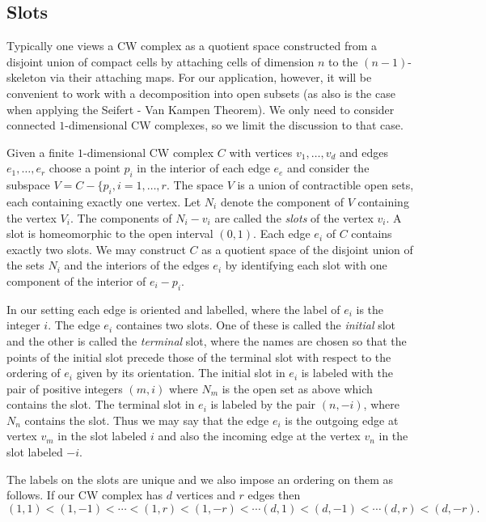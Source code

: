 \documentclass[12pt]{article}
\theoremstyle{definition}
\begin{document}
   \subsection{Slots}

   Typically one views a CW complex as a quotient space constructed from a
   disjoint union of compact cells by attaching cells of dimension $n$ to the
   $(n-1)$-skeleton via their attaching maps.  For our application, however, it
   will be convenient to work with a decomposition into open subsets (as also is
   the case when applying the Seifert - Van Kampen Theorem).  We only need to
   consider connected $1$-dimensional CW complexes, so we limit the discussion
   to that case.

   Given a finite $1$-dimensional CW complex $C$ with vertices $v_1, \ldots,
   v_d$ and edges $e_1, \ldots, e_r$ choose a point $p_i$ in the interior of
   each edge $e_e$ and consider the subspace $V = C - \{p_i, i=1, \ldots, r$.
   The space $V$ is a union of contractible open sets, each containing exactly
   one vertex.  Let $N_i$ denote the component of $V$ containing the vertex
   $V_i$.  The components of $N_i - v_i$ are called the {\it slots} of the
   vertex $v_i$.  A slot is homeomorphic to the open interval $(0, 1)$.
   Each edge $e_i$ of $C$ contains exactly two slots.  We may construct $C$
   as a quotient space of the disjoint union of the sets $N_i$ and the interiors
   of the edges $e_i$ by identifying each slot with one component of the
   interior of $e_i - p_i$.

   In our setting each edge is oriented and labelled, where the label of
   $e_i$ is the integer $i$.  The edge $e_i$ containes two slots.  One of
   these is called the {\it initial} slot and the other is called the {\it
     terminal} slot, where the names are chosen so that the points of the
   initial slot precede those of the terminal slot with respect to the ordering
   of $e_i$ given by its orientation.  The initial slot in $e_i$ is labeled with
   the pair of positive integers $(m, i)$ where $N_m$ is the open set as above
   which contains the slot.  The terminal slot in $e_i$ is labeled by the pair
   $(n, -i)$, where $N_n$ contains the slot.  Thus we may say that the
   edge $e_i$ is the outgoing edge at vertex $v_m$ in the slot labeled $i$
   and also the incoming edge at the vertex $v_n$ in the slot labeled $-i$.

   The labels on the slots are unique and we also impose an ordering on them
   as follows.  If our CW complex has $d$ vertices and $r$ edges then
   $$(1, 1) < (1, -1) < \cdots < (1, r) < (1, -r) < \cdots (d, 1) < (d, -1) <
   \cdots (d, r) < (d, -r) .$$
\end{document}

